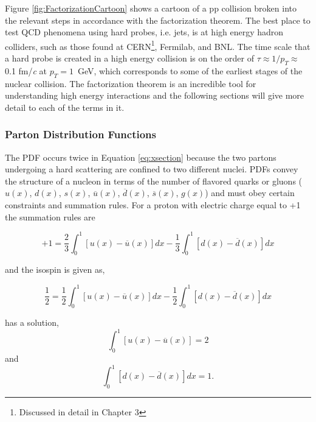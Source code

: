 \noindent
Figure \ref{fig:FactorizationCartoon} shows a cartoon of a pp collision broken into the relevant steps in accordance with the factorization theorem.  The best place to test QCD phenomena using hard probes, i.e. jets, is at high energy hadron colliders, such as those found at CERN\footnote{Discussed in detail in Chapter 3}, Fermilab, and BNL. The time scale that a hard probe is created in a high energy collision is on the order of $\tau \approx 1/p_{T} \approx$ \, 0.1 fm/\textit{c} at $p_{T} = 1 \,$ GeV, which corresponds to some of the earliest stages of the nuclear collision.  The factorization theorem is an incredible tool for understanding high energy interactions and the following sections will give more detail to each of the terms in it.

\subsubsection{Parton Distribution Functions}
The PDF occurs twice in Equation \ref{eq:xsection} because the two partons undergoing a hard scattering are confined to two different nuclei.  PDFs convey the structure of a nucleon in terms of the number of flavored quarks or gluons ($u(x)$, $d(x)$, $s(x)$, $\overline{u}(x)$, $\overline{d}(x)$, $\overline{s}(x)$, $g(x)$) and must obey certain constraints and summation rules.  For a proton with electric charge equal to +1 the summation rules are

\begin{equation}
+1 = \frac{2}{3} \int_{0}^{1} [u(x) - \overline{u}(x)] dx - \frac{1}{3} \int^{1}_{0} [d(x) - \overline{d}(x)] dx
\label{eq:PDFcharge}
\end{equation}

\noindent
and the isospin is given as,

\begin{equation}
\frac{1}{2} = \frac{1}{2} \int_{0}^{1} [u(x) - \overline{u}(x)] dx - \frac{1}{2} \int^{1}_{0} [d(x) - \overline{d}(x)] dx
\label{eq:PDFIso}
\end{equation}

\noindent
has a solution,
\begin{equation}
 \int_{0}^{1} [u(x) - \overline{u}(x)] = 2
\label{eq:PDFSouU}
\end{equation}
\noindent
and
\begin{equation}
\int^{1}_{0} [d(x) - \overline{d}(x)] dx = 1.
\label{eq:PDFSouD}
\end{equation}

